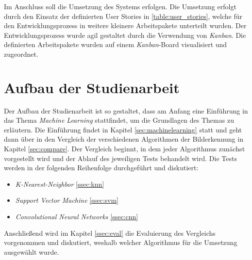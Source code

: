 Im Anschluss soll die Umsetzung des Systems erfolgen. Die Umsetzung erfolgt durch den Einsatz der definierten User Stories in \ref{table:user_stories}, welche für den Entwicklungsprozess in weitere kleinere Arbeitspakete unterteilt wurden. Der Entwicklungsprozess wurde agil gestaltet durch die Verwendung von \textit{Kanban}. Die definierten Arbeitspakete wurden auf einem \textit{Kanban}-Board visualisiert und zugeordnet.

\section{Aufbau der Studienarbeit}
Der Aufbau der Studienarbeit ist so gestaltet, dass am Anfang eine Einführung in das Thema \textit{Machine Learning} stattfindet, um die Grundlagen des Themas zu erläutern. Die Einführung findet in Kapitel \ref{sec:machinelearning} statt und geht dann über in den Vergleich der verschiedenen Algorithmen der Bilderkennung in Kapitel \ref{sec:compare}. Der Vergleich beginnt, in dem jeder Algorithmus zunächst vorgestellt wird und der Ablauf des jeweiligen Tests behandelt wird. Die Tests werden in der folgenden Reihenfolge durchgeführt und diskutiert:
\begin{itemize}
    \item \textit{K-Nearest-Neighbor} \ref{ssec:knn}
    \item \textit{Support Vector Machine} \ref{ssec:svm}
    \item \textit{Convolutional Neural Networks} \ref{ssec:cnn}
\end{itemize}

Anschließend wird im Kapitel \ref{ssec:eval} die Evaluierung des Vergleichs vorgenommen und diskutiert, weshalb welcher Algorithmus für die Umsetzung ausgewählt wurde.

